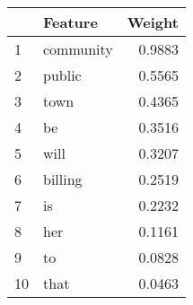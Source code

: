\begin{tabular}{llr}
\toprule
{} &    Feature &  Weight \\
\midrule
1  &  community &  0.9883 \\
2  &     public &  0.5565 \\
3  &       town &  0.4365 \\
4  &         be &  0.3516 \\
5  &       will &  0.3207 \\
6  &    billing &  0.2519 \\
7  &         is &  0.2232 \\
8  &        her &  0.1161 \\
9  &         to &  0.0828 \\
10 &       that &  0.0463 \\
\bottomrule
\end{tabular}
